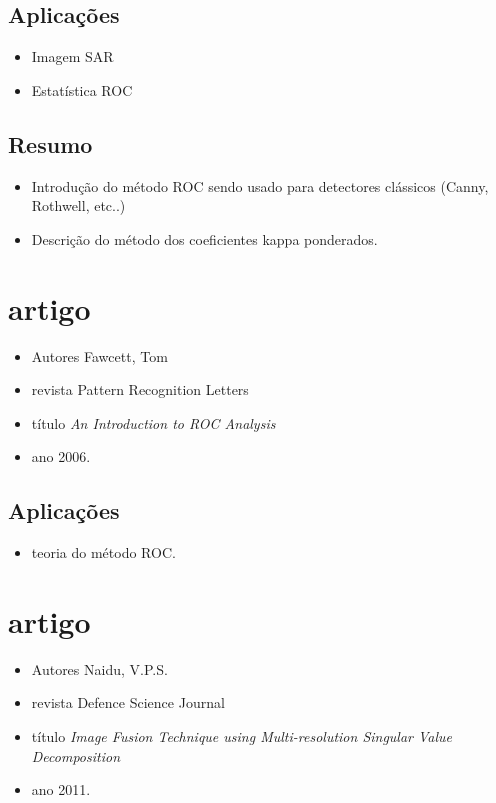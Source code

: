 \documentclass{article}
\begin{document}
\subsection{Aplicações}
\begin{itemize}
\item Imagem SAR
\item Estatística ROC
\end{itemize}
\subsection{Resumo}
\begin{itemize}
\item Introdução do método ROC sendo usado para detectores clássicos (Canny, Rothwell, etc..) 
\item Descrição do método dos coeficientes kappa ponderados.
\end{itemize}
\section{artigo \cite{fawcett}}
\begin{itemize}
\item Autores Fawcett, Tom
\item revista Pattern Recognition Letters
\item título \textit{An Introduction to {ROC} Analysis}
\item ano 2006.
\end{itemize}
\subsection{Aplicações}
\begin{itemize}
\item teoria do método ROC.
\end{itemize}
\section{artigo \cite{naidu}}
\begin{itemize}
\item Autores Naidu, V.P.S.
\item revista Defence Science Journal
\item título \textit{Image Fusion Technique using Multi-resolution Singular Value Decomposition}
\item ano 2011.
\end{itemize}
\end{document}
